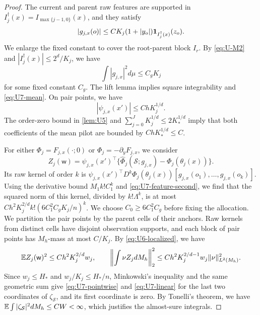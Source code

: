 \begin{proof}
The current and parent raw features are supported in
$I_j^\dagger(x)=I_{\max\{j-1,0\}}(x)$, and they satisfy
\begin{equation}\label{eq:U7-feature}
 |g_{j,x}(o)|\le CK_j(1+|y_o|)\mathbf 1_{I_j^\dagger(x)}(z_o).
\end{equation}
We enlarge the fixed constant to cover the root-parent block $I_r$.
By \eqref{eq:U-M2} and $|I_j^\dagger(x)|\le2^d/K_j$, we have
\begin{equation}\label{eq:U7-feature-second}
 \int|g_{j,x}|^2d\mu\le C_gK_j
\end{equation}
for some fixed constant $C_g$. The lift lemma implies square
integrability and \eqref{eq:U7-mean}. On pair points, we have
\begin{equation}\label{eq:U7-psi}
 |\psi_{j,x}(x')|\le ChK_j^{1/d}.
\end{equation}
The order-zero bound in \cref{lem:U5} and
$\sum_{j=0}^JK_j^{1/d}\le2K_*^{1/d}$ imply that both coefficients of
the mean pilot are bounded by $ChK_*^{1/d}\le C$.

For either $\Phi_j=F_{j,x}(\cdot;0)$ or
$\Phi_j=-\partial_yF_{j,x}$, we consider
\[
 Z_j(\mathsf w)=\psi_{j,x}(x')^\top
 \{\widehat\Phi_j(\mathcal S;g_{j,x})-\Phi_j(\theta_j(x))\}.
\]
Its raw kernel of order $k$ is
$\psi_{j,x}(x')^\top D^k\Phi_j(\theta_j(x))
[g_{j,x}(o_1),\ldots,g_{j,x}(o_k)]$.
Using the derivative bound $M_1k!C_1^k$ and
\eqref{eq:U7-feature-second}, we find that the squared norm of this
kernel, divided by $k!\Lambda^k$, is at most
$Ch^2K_j^{2/d}k!(6C_1^2C_gK_j/n)^k$.
We choose $C_0\ge6C_1^2C_g$ before fixing the allocation.
We partition the pair points by the parent cells of their anchors. Raw
kernels from distinct cells have disjoint observation supports, and each
block of pair points has $M_h$-mass at most $C/K_j$. By
\eqref{eq:U6-localized}, we have
\[
 \mathbb E Z_j(\mathsf w)^2\le Ch^2K_j^{2/d}w_j,\qquad
 \left\|\int\nu Z_jdM_h\right\|_2^2
 \le Ch^2K_j^{2/d-1}w_j\|\nu\|_{L^2(M_h)}^2.
\]
Since $w_j\le H_*$ and $w_j/K_j\le H_*/n$, Minkowski's inequality and
the same geometric sum give \eqref{eq:U7-pointwise} and
\eqref{eq:U7-linear} for the last two coordinates of
$\zeta_{\mathcal S}$, and its first coordinate is zero. By Tonelli's
theorem, we have $\mathbb E\int|\zeta_{\mathcal S}|^2dM_h\le CW<\infty$, which
justifies the almost-sure integrals.


\end{proof}
